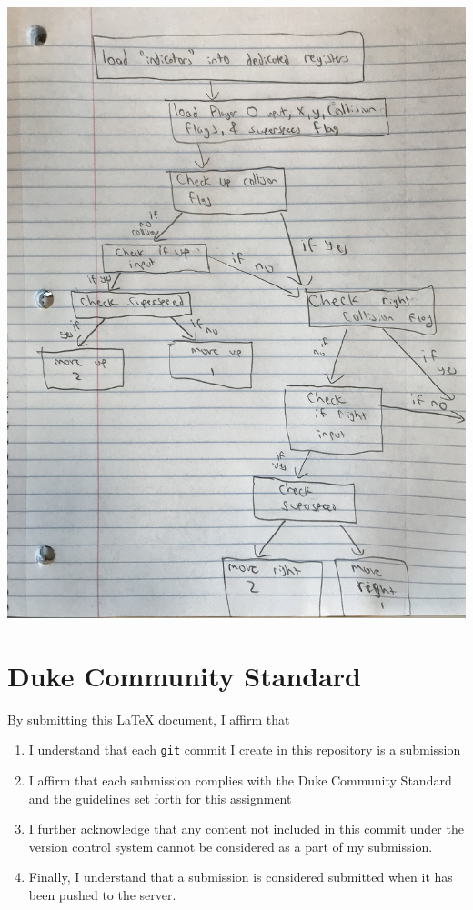 \documentclass[letterpaper]{article} %
\begin{document}
\includegraphics[scale=0.1]{mips_logic.jpg}


\section*{Duke Community Standard}

By submitting this \LaTeX{} document, I affirm that
\begin{enumerate}
    \item I understand that each \texttt{git} commit I create in this repository is a submission
    \item I affirm that each submission complies with the Duke Community Standard and the guidelines set forth for this assignment
    \item I further acknowledge that any content not included in this commit under the version control system cannot be considered as a part of my submission.
    \item Finally, I understand that a submission is considered submitted when it has been pushed to the server.
\end{enumerate}
\end{document}
